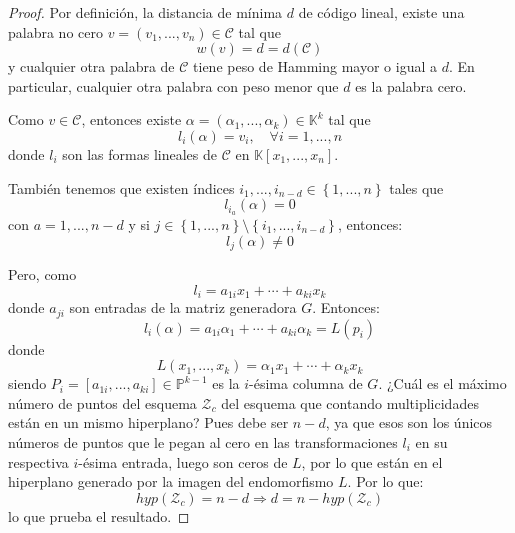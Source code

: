 \documentclass[12pt]{report}
\theoremstyle{largebreak}
\begin{document}
    \begin{proof}
        Por definición, la distancia de mínima $d$ de código lineal, existe una palabra no cero $v=(v_1,...,v_n)\in\mathcal{C}$ tal que
        \begin{equation*}
            w(v)=d=d(\mathcal{C})
        \end{equation*}
        y cualquier otra palabra de $\mathcal{C}$ tiene peso de Hamming mayor o igual a $d$. En particular, cualquier otra palabra con peso menor que $d$ es la palabra cero.

        Como $v\in\mathcal{C}$, entonces existe $\alpha=(\alpha_1,...,\alpha_k)\in \mathbb{K}^k$ tal que
        \begin{equation*}
            l_i(\alpha)=v_i,\quad\forall i=1,...,n
        \end{equation*}
        donde $l_i$ son las formas lineales de $\mathcal{C}$ en $\mathbb{K}[x_1,...,x_n]$.

        También tenemos que existen índices $i_1,...,i_{ n-d}\in\left\{1,...,n \right\}$ tales que
        \begin{equation*}
            l_{ i_a}(\alpha)=0
        \end{equation*}
        con $a=1,...,n-d$ y si $j\in\left\{1,...,n \right\}\setminus\left\{i_1,...,i_{ n-d} \right\}$, entonces:
        \begin{equation*}
            l_j(\alpha)\neq0
        \end{equation*}

        Pero, como
        \begin{equation*}
            l_i=a_{ 1i}x_1+\cdots+a_{ ki}x_k
        \end{equation*}
        donde $a_{ ji}$ son entradas de la matriz generadora $G$. Entonces:
        \begin{equation*}
            l_i(\alpha)=a_{ 1i}\alpha_1+\cdots+a_{ ki}\alpha_k=L(p_i)
        \end{equation*}
        donde
        \begin{equation*}
            L(x_1,...,x_k)=\alpha_1x_1+\cdots+\alpha_kx_k
        \end{equation*}
        siendo $P_i=[a_{ 1i},...,a_{ ki}]\in\mathbb{P}^{ k-1}$ es la $i$-ésima columna de $G$. ¿Cuál es el máximo número de puntos del esquema $\mathcal{Z}_c$ del esquema que contando multiplicidades están en un mismo hiperplano? Pues debe ser $n-d$, ya que esos son los únicos números de puntos que le pegan al cero en las transformaciones $l_i$ en su respectiva $i$-ésima entrada, luego son ceros de $L$, por lo que están en el hiperplano generado por la imagen del endomorfismo $L$. Por lo que:
        \begin{equation*}
            hyp(\mathcal{Z}_c)=n-d\Rightarrow d=n-hyp(\mathcal{Z}_c)
        \end{equation*}
        lo que prueba el resultado.
    \end{proof}
\end{document}
